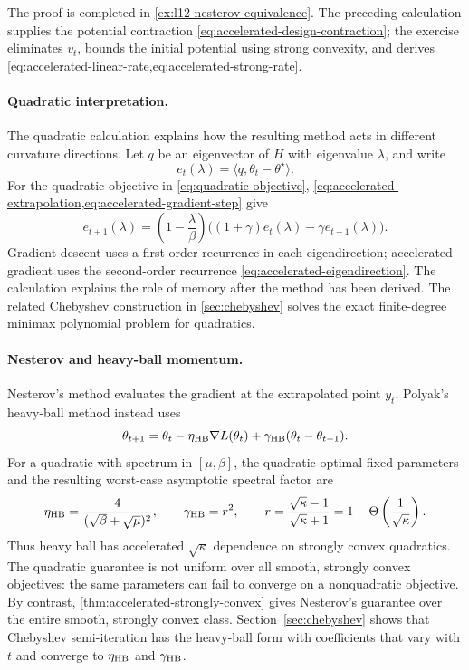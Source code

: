 \documentclass[11pt,twoside]{article}
\theoremstyle{definition}
\theoremstyle{remark}
\begin{document}
The proof is completed in
\cref{ex:l12-nesterov-equivalence}. The preceding calculation supplies the
potential contraction \cref{eq:accelerated-design-contraction}; the exercise
eliminates $v_t$, bounds the initial potential using strong convexity, and
derives \cref{eq:accelerated-linear-rate,eq:accelerated-strong-rate}.

\paragraph{Quadratic interpretation.}
The quadratic calculation explains how the resulting method acts in different
curvature directions. Let $q$ be an eigenvector of $H$ with eigenvalue
$\lambda$, and write
\[
 e_t(\lambda)=\langle q,\theta_t-\theta^\star\rangle.
\]
For the quadratic objective in \cref{eq:quadratic-objective},
\cref{eq:accelerated-extrapolation,eq:accelerated-gradient-step} give
\begin{equation}
 e_{t+1}(\lambda)
 =\left(1-\frac{\lambda}{\beta}\right)
  \bigl((1+\gamma)e_t(\lambda)-\gamma e_{t-1}(\lambda)\bigr).
 \label{eq:accelerated-eigendirection}
\end{equation}
Gradient descent uses a first-order recurrence in each eigendirection;
accelerated gradient uses the second-order recurrence
\cref{eq:accelerated-eigendirection}. The calculation explains the role of
memory after the method has been derived. The related Chebyshev construction
in \cref{sec:chebyshev} solves the exact finite-degree minimax polynomial
problem for quadratics.

\paragraph{Nesterov and heavy-ball momentum.}
Nesterov's method evaluates the gradient at the extrapolated point $y_t$.
Polyak's heavy-ball method instead uses
\[
 \theta_{t+1}
 =\theta_t-\eta_{\rm HB}\nabla L(\theta_t)
  +\gamma_{\rm HB}(\theta_t-\theta_{t-1}).
\]
For a quadratic with spectrum in $[\mu,\beta]$, the quadratic-optimal fixed
parameters and the resulting worst-case asymptotic spectral factor are
\[
 \eta_{\rm HB}=\frac{4}{(\sqrt\beta+\sqrt\mu)^2},
 \qquad
 \gamma_{\rm HB}=r^2,
 \qquad
 r=\frac{\sqrt\kappa-1}{\sqrt\kappa+1}
   =1-\Theta\left(\frac1{\sqrt\kappa}\right).
\]
Thus heavy ball has accelerated $\sqrt\kappa$ dependence on strongly convex
quadratics. The quadratic guarantee is not uniform over all smooth, strongly
convex objectives: the same parameters can fail to converge on a
nonquadratic objective. By contrast,
\cref{thm:accelerated-strongly-convex} gives Nesterov's guarantee over the
entire smooth, strongly convex class. Section~\ref{sec:chebyshev} shows that
Chebyshev semi-iteration has the heavy-ball form with coefficients that vary
with $t$ and converge to $\eta_{\rm HB}$ and $\gamma_{\rm HB}$.
\end{document}
